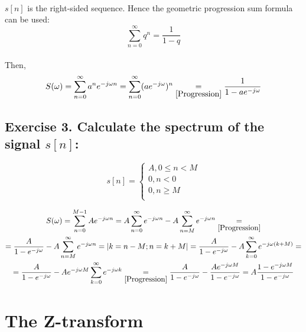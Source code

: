 \documentclass[14pt]{article}
\begin{document}
\paragraph{}
$ s[n] $ is the right-sided sequence. Hence the geometric
	progression sum formula can be used:
\begin{equation} \label{Progression}
	\sum_{n = 0}^\infty q^n 
	=
	\frac{1}{1 - q}
\end{equation}

\paragraph{}
Then,
\begin{equation}
	S(\omega) 
	=
	\sum_{n = 0}^\infty a^n e^{-j \omega n}
	=
	\sum_{n = 0}^\infty (a e^{-j \omega})^n 
	\underset{\eqref{Progression}}{=}
	\frac{1}{1 - a e^{-j \omega}}
\end{equation}

\subsection{Exercise 3. Calculate the spectrum of the signal 
	$ s[n] $:}
\begin{equation}
	s[n]
	=
	\left\{  
	\begin{array}{rcl}  
		A, 0 \leq n < M\\  
		0, n < 0\\    
		0, n \geq M\\  
	\end{array}
	\right.
\end{equation}

\begin{multline}
	S(\omega)
	=
	\sum_{n = 0}^{M - 1} A e^{-j \omega n} 
	=
	A \sum_{n = 0}^{\infty} e^{-j \omega n} 
		- A \sum_{n = M}^{\infty} e^{-j \omega n}
	\underset{\eqref{Progression}}{=}\\=
	\frac{A}{1 - e^{-j \omega}} 
		- A \sum_{n = M}^{\infty} e^{-j \omega n}
	=
	|k = n - M; n = k + M|
	=
	\frac{A}{1 - e^{-j \omega}} 
		- A \sum_{k = 0}^{\infty} e^{-j \omega (k + M)}
	=\\=
	\frac{A}{1 - e^{-j \omega}} 
		- A e^{-j \omega M} \sum_{k = 0}^{\infty} e^{-j \omega k}
	\underset{\eqref{Progression}}{=}
	\frac{A}{1 - e^{-j \omega}} 
		- \frac{A e^{-j \omega M}}{1 - e^{-j \omega}}
	=
	A \frac{1 - e^{-j \omega M}}{1 - e^{-j \omega}}
\end{multline}

\section{The Z-transform}
\end{document}
